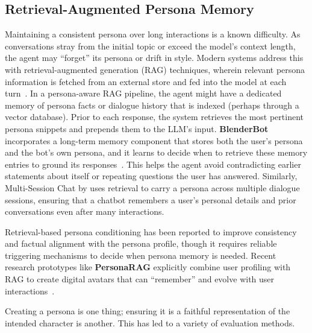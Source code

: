 \subsection{Retrieval-Augmented Persona Memory}
Maintaining a consistent persona over long interactions is a known difficulty. As conversations stray from the initial topic or exceed the model's context length, the agent may ``forget'' its persona or drift in style. Modern systems address this with retrieval-augmented generation (RAG) techniques, wherein relevant persona information is fetched from an external store and fed into the model at each turn~\cite{shuster2022blenderbot3deployedconversational,xu-etal-2022-beyond}. In a persona-aware RAG pipeline, the agent might have a dedicated memory of persona facts or dialogue history that is indexed (perhaps through a vector database). Prior to each response, the system retrieves the most pertinent persona snippets and prepends them to the LLM's input. \textbf{BlenderBot}~\cite{shuster2022blenderbot3deployedconversational} incorporates a long-term memory component that stores both the user's persona and the bot's own persona, and it learns to decide when to retrieve these memory entries to ground its responses~\cite{shuster2022blenderbot3deployedconversational}. This helps the agent avoid contradicting earlier statements about itself or repeating questions the user has answered. Similarly, Multi-Session Chat by \citet{xu-etal-2022-beyond} uses retrieval to carry a persona across multiple dialogue sessions, ensuring that a chatbot remembers a user's personal details and prior conversations even after many interactions.

Retrieval-based persona conditioning has been reported to improve consistency and factual alignment with the persona profile, though it requires reliable triggering mechanisms to decide when persona memory is needed. Recent research prototypes like \textbf{PersonaRAG} explicitly combine user profiling with RAG to create digital avatars that can ``remember'' and evolve with user interactions~\cite{kimara2025personaaileveragingretrievalaugmentedgeneration}.

Creating a persona is one thing; ensuring it is a faithful representation of the intended character is another. This has led to a variety of evaluation methods.

